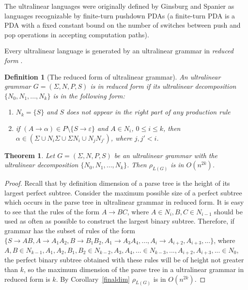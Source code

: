 \documentclass[11pt,a4paper]{article} %
\newtheorem{theorem}{Theorem}
\newtheorem{definition}{Definition}
\begin{document}
The ultralinear languages were originally defined by Ginsburg and Spanier \cite{Ginsburg1966FiniteTurnPA} as languages recognizable by finite-turn pushdown PDAs (a finite-turn PDA is a PDA with a fixed constant bound on the number of switches between push and pop operations in accepting computation paths). 

Every ultralinear language is generated by an ultralinear grammar in \textit{reduced form} \cite{WORKMAN1976188}.
\begin{definition}[The reduced form of ultralinear grammar]
An ultralinear grammar $G = (\Sigma, N, P, S)$ is in \textit{reduced form} if its ultralinear decomposition $\{N_0, N_1, ..., N_k\}$ is in the following form:
\begin{enumerate}
\item $N_k=\{S\}$ and $S$ does not appear in the right part of any production rule
\item if $(A \rightarrow \alpha) \in P \setminus \{S \rightarrow \varepsilon\}$ and $A \in N_i$, $0 \le i \le k$, then $\alpha \in (\Sigma \cup N_i\Sigma \cup \Sigma N_i \cup N_jN_{j'})$, where $j, j' < i$.
\end{enumerate}
\end{definition}
\begin {theorem}
Let $G = (\Sigma, N, P, S)$ be an ultralinear grammar with the ultralinear decomposition $\{N_0, N_1, ..., N_k\}$. Then $\rho_{L(G)}$ is in $O(n^{2k})$.
\end{theorem}
\begin{proof}
Recall that by definition dimension of a parse tree is the height of its largest perfect subtree. Consider the maximum possible size of a perfect subtree which occurs in the parse tree in ultralinear grammar in reduced form. It is easy to see that the rules of the form $A \rightarrow BC$, where $A \in N_i, B, C \in N_{i-1}$ should be used as often as possible to construct the largest binary subtree. Therefore, if grammar has the subset of rules of the form $\{S \rightarrow AB, A \rightarrow A_1A_2, B \rightarrow B_1B_2, A_1\rightarrow A_3A_4, ..., A_i \rightarrow A_{i+2}, A_{i+3}, ...\}$, where $A, B \in N_{k-1}, A_1, A_2, B_1, B_2 \in N_{k-2}, A_3, A_4, ... \in N_{k-3}, ... , A_{i+2}, A_{i+3}, ... \in N_0$, the perfect binary subtree obtained with these rules will be of height not greater than $k$, so the maximum dimension of the parse tree in a ultralinear grammar in reduced form is $k$. By Corollary~\ref{finaldim}  $\rho_{L(G)}$ is in $O(n^{2k})$.
\end{proof}
\end{document}
